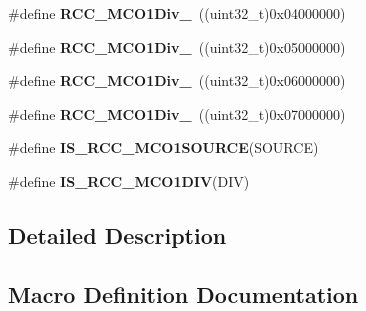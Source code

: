 \begin{DoxyCompactItemize}
\item 
\#define {\bfseries R\+C\+C\+\_\+\+M\+C\+O1\+Div\+\_}~((uint32\+\_\+t)0x04000000)\hypertarget{group___r_c_c___m_c_o1___clock___source___prescaler_gab0247962772ebf1735b7b2a84c235415}{}\label{group___r_c_c___m_c_o1___clock___source___prescaler_gab0247962772ebf1735b7b2a84c235415}

\item 
\#define {\bfseries R\+C\+C\+\_\+\+M\+C\+O1\+Div\+\_}~((uint32\+\_\+t)0x05000000)\hypertarget{group___r_c_c___m_c_o1___clock___source___prescaler_ga298d00af4cd40822e28a5a20d6cdbfb6}{}\label{group___r_c_c___m_c_o1___clock___source___prescaler_ga298d00af4cd40822e28a5a20d6cdbfb6}

\item 
\#define {\bfseries R\+C\+C\+\_\+\+M\+C\+O1\+Div\+\_}~((uint32\+\_\+t)0x06000000)\hypertarget{group___r_c_c___m_c_o1___clock___source___prescaler_ga2300f224151c8e15424142ee4fc5f549}{}\label{group___r_c_c___m_c_o1___clock___source___prescaler_ga2300f224151c8e15424142ee4fc5f549}

\item 
\#define {\bfseries R\+C\+C\+\_\+\+M\+C\+O1\+Div\+\_}~((uint32\+\_\+t)0x07000000)\hypertarget{group___r_c_c___m_c_o1___clock___source___prescaler_ga756a1097bf0e4fe15d72f113572d0c04}{}\label{group___r_c_c___m_c_o1___clock___source___prescaler_ga756a1097bf0e4fe15d72f113572d0c04}

\item 
\#define {\bfseries I\+S\+\_\+\+R\+C\+C\+\_\+\+M\+C\+O1\+S\+O\+U\+R\+CE}(S\+O\+U\+R\+CE)
\item 
\#define {\bfseries I\+S\+\_\+\+R\+C\+C\+\_\+\+M\+C\+O1\+D\+IV}(D\+IV)
\end{DoxyCompactItemize}


\subsection{Detailed Description}


\subsection{Macro Definition Documentation}
